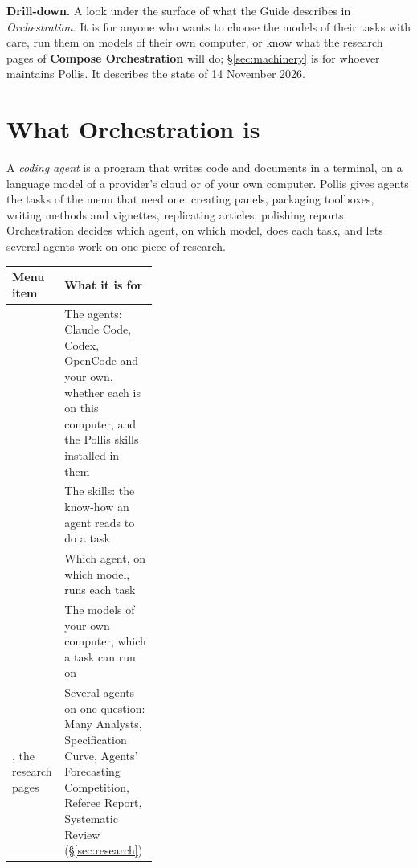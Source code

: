 \begin{nbox}
{\color{amber}\bfseries Drill-down.}\enspace
A look under the surface of what the Guide describes in \emph{Orchestration}. It is for anyone who wants to choose
the models of their tasks with care, run them on models of their own computer, or know what the research pages of
\textbf{Compose \gt Orchestration} will do; \S\ref{sec:machinery} is for whoever maintains Pollis. It describes the
state of 14 November 2026.
\end{nbox}

\tableofcontents

\section{What Orchestration is}\label{sec:what}
A \emph{coding agent} is a program that writes code and documents in a terminal, on a language model of a provider's
cloud or of your own computer. Pollis gives agents the tasks of the  menu that need one: creating
panels, packaging toolboxes, writing methods and vignettes, replicating articles, polishing reports. Orchestration
decides which agent, on which model, does each task, and lets several agents work on one piece of research.

\begin{center}\small
\renewcommand{\arraystretch}{1.25}
\begin{tabularx}{\linewidth}{@{}p{0.36\linewidth}L@{}}
\toprule
\textbf{Menu item} & \textbf{What it is for}\\
\midrule
{} & The agents: Claude Code, Codex, OpenCode and your own, whether each is on this
  computer, and the Pollis skills installed in them\\
 & The skills: the know-how an agent reads to do a task\\
 & Which agent, on which model, runs each task\\
 & The models of your own computer, which a task can run on\\
, the research pages & Several agents on one question: Many Analysts,
  Specification Curve, Agents' Forecasting Competition, Referee Report, Systematic Review (\S\ref{sec:research})\\
\bottomrule
\end{tabularx}
\end{center}

